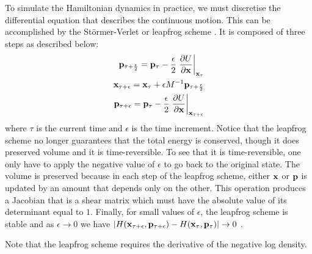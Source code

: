 \documentclass{article} %
\begin{document}
To simulate the Hamiltonian dynamics in practice, we must discretise the differential equation that describes the continuous motion. This can be accomplished by the St\"{o}rmer-Verlet or leapfrog scheme \cite{leimkuhler2004simulating}. It is composed of three steps as described below:
\begin{eqnarray} 
 {\bf p}_{\tau + \frac{\epsilon}{2}} = {\bf p}_{\tau} - \frac{\epsilon}{2}\left. \frac{\partial U}{\partial {\bf x}}\right|_{{\bf x}_{\tau}}\\
 {\bf x}_{\tau + \epsilon} = {\bf x}_{\tau} + \epsilon M^{-1}{\bf p}_{\tau + \frac{\epsilon}{2}} \\
 {\bf p}_{\tau + \epsilon} = {\bf p}_{\tau} - \frac{\epsilon}{2}\left. \frac{\partial U}{\partial {\bf x}}\right|_{{\bf x}_{\tau + \epsilon}}
\end{eqnarray}
where $\tau$ is the current time and $\epsilon$ is the time increment. Notice that the leapfrog scheme no longer guarantees that the total energy is conserved, though it does preserved volume and it is time-reversible. To see that it is time-reversible, one only have to apply the negative value of $\epsilon$ to go back to the original state. The volume is preserved because in each step of the leapfrog scheme, either ${\bf x}$ or ${\bf p}$ is updated by an amount that depends only on the other. This operation produces a Jacobian that is a shear matrix which must have the absolute value of its determinant equal to $1$. Finally, for small values of $\epsilon$, the leapfrog scheme is stable and as $\epsilon\rightarrow0$ we have $|H({\bf x}_{\tau + \epsilon},{\bf p}_{\tau + \epsilon}) - H({\bf x}_{\tau},{\bf p}_{\tau})|\rightarrow0$ \cite{leimkuhler2004simulating}. 

Note that the leapfrog scheme requires the derivative of the negative log density.
\end{document}

